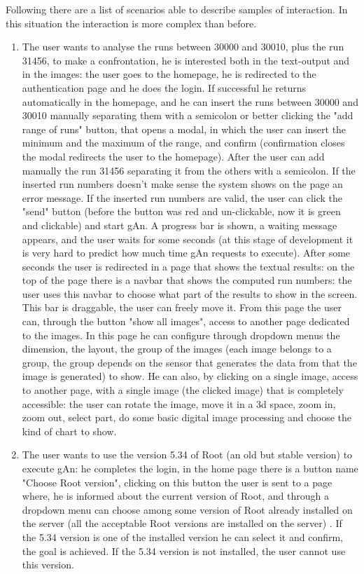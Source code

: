 Following there are a list of scenarios able to describe samples of interaction. In this situation the interaction is more complex than before.

\begin{enumerate}

\item The user wants to analyse the runs between 30000 and 30010, plus the run 31456, to make a confrontation, he is interested both in the text-output and in the images: 
the user goes to the homepage, he is redirected to the authentication page and he does the login. If successful he returns automatically in the homepage, and he can insert the runs between 30000 and 30010 manually separating them with a semicolon or better clicking the "add range of runs" button, that opens a modal, in which the user can insert the minimum and the maximum of the range, and confirm (confirmation closes the modal redirects the user to the homepage). After the user can add manually the run 31456 separating it from the others with a semicolon. If the inserted run numbers doesn't make sense the system shows on the page an error message. If the inserted run numbers are valid, the user can click the "send" button (before the button was red and un-clickable, now it is green and clickable) and start gAn. A progress bar is shown, a waiting message appears, and the user waits for some seconds (at this stage of development it is very hard to predict how much time gAn requests to execute). After some seconds the user is redirected in a page that shows the textual results: on the top of the page there is a navbar that shows the computed run numbers: the user uses this navbar to choose what part of the results to show in the screen. This bar is draggable, the user can freely move it. From this page the user can, through the button "show all images", access to another page dedicated to the images. In this page he can configure through dropdown menus the dimension, the layout, the group of the images (each image belongs to a group, the group depends on the sensor that generates the data from that the image is generated) to show. He can also, by clicking on a single image, access to another page, with a single image (the clicked image) that is completely accessible: the user can rotate the image, move it in a 3d space, zoom in, zoom out, select part, do some basic digital image processing and choose the kind of chart to show.   

\item The user wants to use the version 5.34 of Root (an old but stable version) to execute gAn: 
he completes the login, in the home page there is a button name "Choose Root version", clicking on this button the user is sent to a page where, he is informed about the current version of Root, and through a dropdown menu can choose among some version of Root already installed on the server (all the acceptable Root versions are installed on the server) . If the 5.34 version is one of the installed version he can select it and confirm, the goal is achieved. If the 5.34 version is not installed, the user cannot use this version.  


\end{enumerate}
